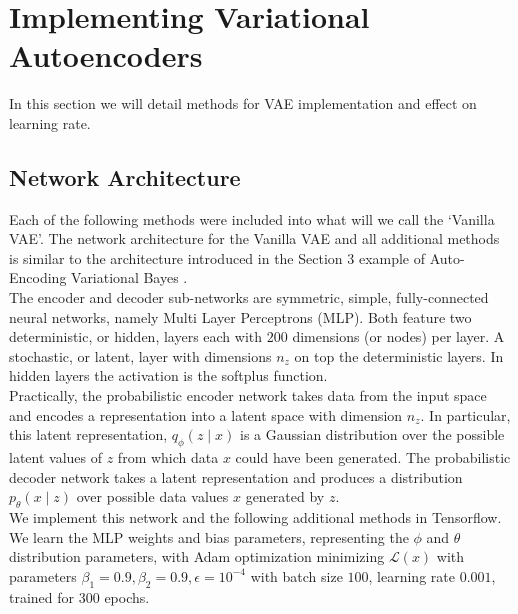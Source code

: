 \documentclass{article} %
\renewcommand{\L}{\mathcal{L}}
\begin{document}
 

\section{Implementing Variational Autoencoders}
In this section we will detail methods for VAE implementation and effect on learning rate.\\
\subsection{Network Architecture}
Each of the following methods were included into what will we call the `Vanilla VAE'. The network architecture for the Vanilla VAE and all additional methods is similar to the architecture introduced in the Section $3$ example of Auto-Encoding Variational Bayes \cite{Kingma2013}.\\
The encoder and decoder sub-networks are symmetric, simple, fully-connected neural networks, namely Multi Layer Perceptrons (MLP). Both feature two deterministic, or hidden, layers each with $200$ dimensions (or nodes) per layer. A stochastic, or latent, layer with dimensions $n_z$ on top the deterministic layers. In hidden layers the activation is the softplus function.\\
Practically, the probabilistic encoder network takes data from the input space and encodes a representation into a latent space with dimension $n_z$. In particular, this latent representation, ${q_\phi(z \mid x)}$ is a Gaussian distribution over the possible latent values of $z$ from which data $x$ could have been generated. The probabilistic decoder network takes a latent representation and produces a distribution ${p_\theta(x\mid z)}$ over possible data values $x$ generated by $z$.\\
We implement this network and the following additional methods in Tensorflow. We learn the MLP weights and bias parameters, representing the $\phi$ and $\theta$ distribution parameters, with Adam optimization minimizing $\L(x)$ with parameters $\beta_1 = 0.9, \beta_2 = 0.9, \epsilon = 10^{-4}$ with batch size $100$, learning rate $0.001$, trained for $300$ epochs.
\end{document}
